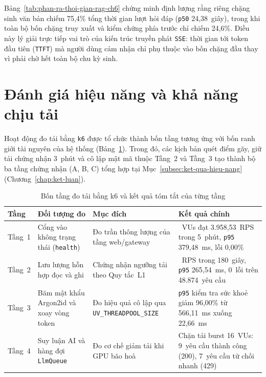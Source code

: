 Bảng~\ref{tab:phan-ra-thoi-gian-rag-ch6} chứng minh định lượng rằng riêng chặng sinh văn bản chiếm 75,4\% tổng thời gian lượt hỏi đáp (\texttt{p50} 24,38~giây), trong khi toàn bộ bốn chặng truy xuất và kiểm chứng phía trước chỉ chiếm 24,6\%. Điều này lý giải trực tiếp vai trò của kiến trúc truyền phát \texttt{SSE}: thời gian tới token đầu tiên (\texttt{TTFT}) mà người dùng cảm nhận chỉ phụ thuộc vào bốn chặng đầu thay vì phải chờ hết toàn bộ chu kỳ sinh.

\section{Đánh giá hiệu năng và khả năng chịu tải}
\label{sec:danh-gia-hieu-nang}

Hoạt động đo tải bằng \texttt{k6} được tổ chức thành bốn tầng tương ứng với bốn ranh giới tài nguyên của hệ thống (Bảng~\ref{tab:bon-tang-do-tai}). Trong đó, các kịch bản quét điểm gãy, giữ tải chứng nhận 3~phút và cô lập mật mã thuộc Tầng~2 và Tầng~3 tạo thành bộ ba tầng chứng nhận (A, B, C) tổng hợp tại Mục~\ref{subsec:ket-qua-hieu-nang} (Chương~\ref{chap:ket-luan}).

\begin{table}[htbp]
\centering
\caption{Bốn tầng đo tải bằng k6 và kết quả tóm tắt của từng tầng}
\label{tab:bon-tang-do-tai}
\small
\begin{tabularx}{\textwidth}{
  >{\raggedright\arraybackslash}p{1.5cm}
  >{\raggedright\arraybackslash}p{3.4cm}
  >{\raggedright\arraybackslash}p{3.6cm}
  >{\raggedright\arraybackslash}X
}
\toprule
\textbf{Tầng} & \textbf{Đối tượng đo} & \textbf{Mục đích} & \textbf{Kết quả chính} \\
\midrule
Tầng~1 & Cổng vào không trạng thái (\texttt{health}) & Đo trần thông lượng của tầng web/gateway & 1.600~VUs đạt 3.958,53~RPS trong 5~phút, \texttt{p95} 379,48~ms, lỗi 0,00\% \\
\midrule
Tầng~2 & Lưu lượng hỗn hợp đọc và ghi & Chứng nhận ngưỡng tải theo Quy tắc~L1 & 250~RPS trong 180~giây, \texttt{p95} 265,54~ms, 0~lỗi trên 48.874~yêu cầu \\
\midrule
Tầng~3 & Băm mật khẩu Argon2id và xoay vòng token & Đo hiệu quả cô lập qua \texttt{UV\_\allowbreak{}THREADPOOL\_\allowbreak{}SIZE} & \texttt{p95} kiểm tra sức khoẻ giảm 96,00\% từ 566,11~ms xuống 22,66~ms \\
\midrule
Tầng~4 & Suy luận AI và hàng đợi \texttt{LlmQueue} & Đo cơ chế giảm tải khi GPU bão hoà & Chặn tải burst 16~VUs: 9~yêu cầu thành công (200), 7~yêu cầu từ chối nhanh (429) \\
\bottomrule
\end{tabularx}
\end{table}

